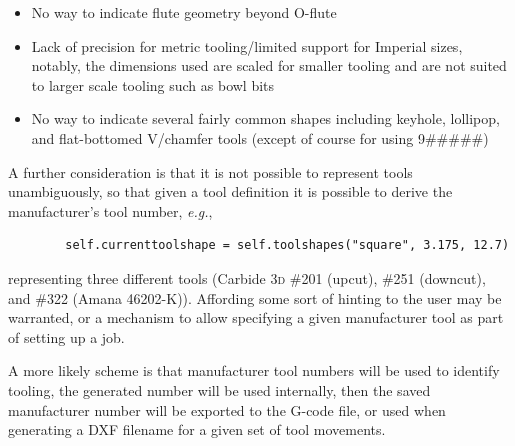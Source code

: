 \documentclass{ltxdoc}
\begin{document}
\begin{itemize}
\item No way to indicate flute geometry beyond O-flute
\item Lack of precision for metric tooling/limited support for Imperial sizes, notably, the dimensions used are scaled for smaller tooling and are not suited to larger scale tooling such as bowl bits
\item No way to indicate several fairly common shapes including keyhole, lollipop, and flat-bottomed V/chamfer tools (except of course for using 9\#\#\#\#\#)
\end{itemize}

A further consideration is that it is not possible to represent tools unambiguously, so that given a tool definition it is possible to derive the manufacturer's tool number, \emph{e.g.}, 

\begin{verbatim}
        self.currenttoolshape = self.toolshapes("square", 3.175, 12.7)
\end{verbatim}

\noindent representing three different tools (Carbide \textsc{3d} \#201 (upcut), \#251 (downcut), and \#322 (Amana 46202-K)). Affording some sort of hinting to the user may be warranted, or a mechanism to allow specifying a given manufacturer tool as part of setting up a job.

A more likely scheme is that manufacturer tool numbers will be used to identify tooling, the generated number will be used internally, then the saved manufacturer number will be exported to the G-code file, or used when generating a DXF filename for a given set of tool movements.

\end{document}
